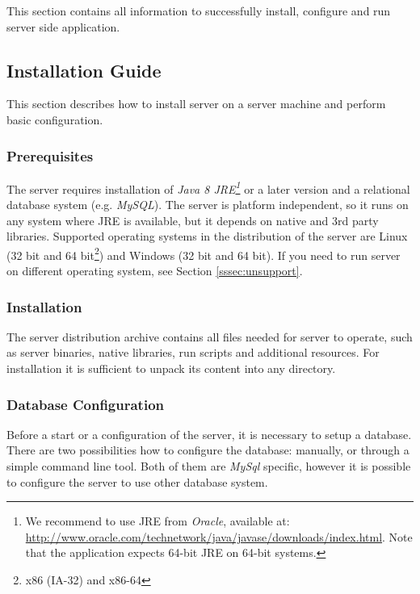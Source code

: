 
This section contains all information to successfully install, configure and run
\textan{} server side application.

\subsection{Installation Guide}

This section describes how to install \textan{} server on a server
machine and perform basic configuration.

\subsubsection{Prerequisites}
\label{sssec:SerInstPre}

The \textan{} server requires installation of \emph{Java 8 JRE\footnote{We
recommend to use JRE from \emph{Oracle}, available at:
\url{http://www.oracle.com/technetwork/java/javase/downloads/index.html}.
Note that the application expects 64-bit JRE on 64-bit systems.}}
or a later version and a relational database system (e.g. \emph{MySQL}).
The server is platform independent, so it runs on any system where JRE is
available, but it depends on native and 3rd party libraries. Supported
operating systems in the distribution of the \textan{} server are Linux (32 bit
and 64 bit\footnote{x86 (IA-32) and x86-64}) and Windows (32 bit and 64 bit).  If you need to
run \textan{} server on different operating system, see Section
\ref{sssec:unsupport}.

\subsubsection{Installation}

The \textan{} server distribution archive contains all files needed for \textan{} server to operate,
such as server binaries, native libraries, run scripts and additional resources.
For installation it is sufficient to unpack its content into any directory.

\subsubsection{Database Configuration}
\label{sssec:DataConfig}

Before a start or a configuration of the \textan{} server, it is necessary to
setup a database. There are two possibilities how to configure the database:
manually, or through a simple command line tool. Both of them are \emph{MySql} specific,
however it is possible to configure the server to use other database system.

